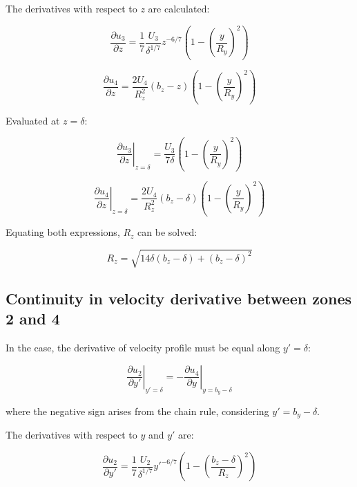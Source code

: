 The derivatives with respect to $z$ are calculated:

\begin{equation}
\frac{\partial u_3}{\partial z} = \frac{1}{7} \frac{U_3}{\delta^{1/7}} z^{-6/7} \left( 1 - \left( \frac{y}{R_y} \right)^2 \right) 
\end{equation}

\begin{equation}
\frac{\partial u_4}{\partial z} = \frac{2 U_4}{R_z^2} \left( b_z - z \right)  \left( 1 - \left( \frac{y}{R_y} \right)^2 \right) 
\end{equation}

Evaluated at $z = \delta$:

\begin{equation}
\left. \frac{\partial u_3}{\partial z}  \right|_{z = \delta} = \frac{U_3}{7 \delta} \left( 1 - \left( \frac{y}{R_y} \right)^2 \right)
\end{equation}

\begin{equation}
\left. \frac{\partial u_4}{\partial z}  \right|_{z = \delta} = \frac{2 U_4}{R_z^2} \left( b_z - \delta \right) \left( 1 - \left( \frac{y}{R_y} \right)^2 \right)
\end{equation}

Equating both expressions, $R_z$ can be solved:

\begin{equation}
\label{eq:3D_BL_RzExpression}
\boxed{
R_z = \sqrt{14 \delta \left( b_z - \delta \right) + \left( b_z - \delta \right)^2 }
}
\end{equation}

\subsection{Continuity in velocity derivative between zones 2 and 4}

In the case, the derivative of velocity profile must be equal along $y' = \delta$:

\begin{equation}
\left. \frac{\partial u_2}{\partial y'}  \right|_{y' = \delta} = \left. - \frac{\partial u_4}{\partial y}  \right|_{y = b_y - \delta}
\end{equation}

where the negative sign arises from the chain rule, considering $y' = b_y - \delta$.

The derivatives with respect to $y$ and $y'$ are:

\begin{equation}
\frac{\partial u_2}{\partial y'} = \frac{1}{7} \frac{U_2}{\delta^{1/7}} y'^{-6/7} \left( 1 - \left( \frac{b_z - \delta}{R_z} \right)^2 \right) 
\end{equation}

